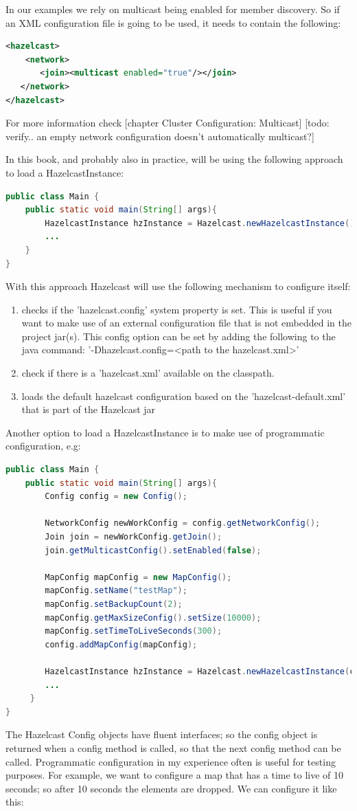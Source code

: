 In our examples we rely on multicast being enabled for member discovery. So if an XML configuration file is going to be used, it needs to contain the following:
\begin{lstlisting}[language=xml]
<hazelcast>
    <network>
       <join><multicast enabled="true"/></join>
   </network>
</hazelcast>
\end{lstlisting}
For more information check [chapter Cluster Configuration: Multicast]
[todo: verify.. an empty network configuration doesn't automatically multicast?]

In this book, and probably also in practice, will be using the following approach to load a HazelcastInstance:
\begin{lstlisting}[language=java]
public class Main {
    public static void main(String[] args){
        HazelcastInstance hzInstance = Hazelcast.newHazelcastInstance();
        ...
    }
}
\end{lstlisting}
With this approach Hazelcast will use the following mechanism to configure itself:
\begin{enumerate}
\item checks if the 'hazelcast.config' system property is set. This is useful if you want to make use of an external configuration file that is not embedded in the project jar(s). This config option can be set by adding the following to the java command: '-Dhazelcast.config=<path to the hazelcast.xml>' 
\item check if there is a 'hazelcast.xml' available on the classpath. 
\item loads the default hazelcast configuration based on the 'hazelcast-default.xml' that is part of the Hazelcast jar
\end{enumerate}

Another option to load a HazelcastInstance is to make use of programmatic configuration, e.g: 
\begin{lstlisting}[language=java]
public class Main {
    public static void main(String[] args){
        Config config = new Config();
                
        NetworkConfig newWorkConfig = config.getNetworkConfig();
        Join join = newWorkConfig.getJoin();
        join.getMulticastConfig().setEnabled(false);
                
        MapConfig mapConfig = new MapConfig();
        mapConfig.setName("testMap");
        mapConfig.setBackupCount(2);
        mapConfig.getMaxSizeConfig().setSize(10000);
        mapConfig.setTimeToLiveSeconds(300);             
        config.addMapConfig(mapConfig);

        HazelcastInstance hzInstance = Hazelcast.newHazelcastInstance(config);
        ...
     }
}
\end{lstlisting}
The Hazelcast Config objects have fluent interfaces; so the config object is returned when a config method is called, so that the next config method can be called. Programmatic configuration in my experience often is useful for testing purposes. For example, we want to configure a map that has a time to live of 10 seconds; so after 10 seconds the elements are dropped. We can configure it like this:

